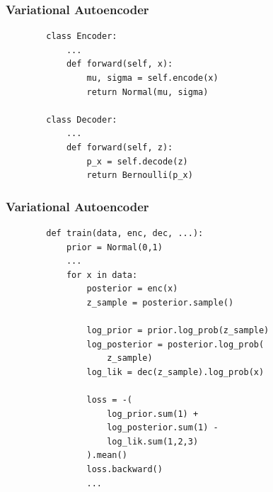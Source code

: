 \documentclass{beamer}
\begin{document}
\begin{frame}[fragile]
    \frametitle{Variational Autoencoder}
    \begin{verbatim}
        class Encoder:
            ...
            def forward(self, x):
                mu, sigma = self.encode(x)
                return Normal(mu, sigma)

        class Decoder:
            ...
            def forward(self, z):
                p_x = self.decode(z)
                return Bernoulli(p_x)
    \end{verbatim}
\end{frame}

\begin{frame}[fragile]
    \frametitle{Variational Autoencoder}
    \begin{verbatim}
        def train(data, enc, dec, ...):
            prior = Normal(0,1)
            ...
            for x in data:
                posterior = enc(x)
                z_sample = posterior.sample()
                
                log_prior = prior.log_prob(z_sample)
                log_posterior = posterior.log_prob(
                    z_sample)
                log_lik = dec(z_sample).log_prob(x)

                loss = -(
                    log_prior.sum(1) +
                    log_posterior.sum(1) -
                    log_lik.sum(1,2,3)
                ).mean()
                loss.backward()
                ...
    \end{verbatim}
\end{frame}
\end{document}
